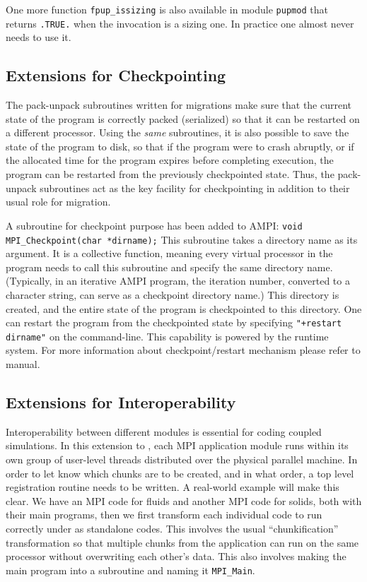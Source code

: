\documentclass[10pt]{article}
\begin{document}
One more function \verb+fpup_issizing+ is also available in module \texttt{pupmod}
that returns \verb+.TRUE.+ when the invocation is a sizing one. In practice one
almost never needs to use it.

\subsection{Extensions for Checkpointing}

The pack-unpack subroutines written for migrations make sure that the current
state of the program is correctly packed (serialized) so that it can be
restarted on a different processor. Using the \emph{same} subroutines, it
is also possible to save the state of the program to disk, so that if the 
program were to crash abruptly, or if the allocated time for the program
expires before completing execution, the program can be restarted from the
previously checkpointed state. Thus, the pack-unpack subroutines act as the 
key facility for checkpointing in addition to their usual role for migration.

A subroutine for checkpoint purpose has been added to AMPI:
\texttt{void MPI\_Checkpoint(char *dirname);}
This subroutine takes a directory name as its argument. It is a collective 
function, meaning every virtual processor in the program needs to call this 
subroutine and specify the same directory name. (Typically, in an
iterative AMPI program, the iteration number, converted to a character string,
can serve as a checkpoint directory name.) This directory is created, and the
entire state of the program is checkpointed to this directory.  One can restart
the program from the checkpointed state by specifying \texttt{"+restart
dirname"} on the command-line. This capability is powered by the \charmpp{} 
runtime system. For more information about \charmpp{} checkpoint/restart
mechanism please refer to \charmpp{} manual. 

\subsection{Extensions for Interoperability}

Interoperability between different modules is essential for coding coupled
simulations.  In this extension to \ampi{}, each MPI application module runs
within its own group of user-level threads distributed over the physical
parallel machine.  In order to let \ampi{} know which chunks are to be created,
and in what order, a top level registration routine needs to be written. A
real-world example will make this clear. We have an MPI code for fluids and
another MPI code for solids, both with their main programs, then we first
transform each individual code to run correctly under \ampi{} as standalone
codes. This involves the usual ``chunkification'' transformation so that
multiple chunks from the application can run on the same processor without
overwriting each other's data. This also involves making the main program into
a subroutine and naming it \texttt{MPI\_Main}.
\end{document}
